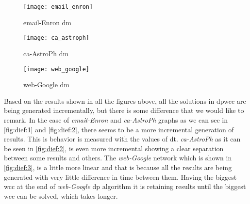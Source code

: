\begin{figure}[!htb]
    \centering
    \begin{minipage}{0.33\textwidth}
     \texttt{[image: email\_enron]}
      \caption{email-Enron \acrshort{dm}}
      \label{fig:dief:1}
    \end{minipage}%
    \begin{minipage}{0.33\textwidth}
     \texttt{[image: ca\_astroph]}
      \caption{ca-AstroPh \acrshort{dm}}
      \label{fig:dief:2}
    \end{minipage}%
    \begin{minipage}{0.33\textwidth}
     \texttt{[image: web\_google]}
      \caption{web-Google \acrshort{dm}}
      \label{fig:dief:3}
    \end{minipage}
\end{figure}

Based on the results shown in all the figures above, all the solutions in \acrshort{dpwcc} are being generated incrementally, 
but there is some difference that we would like to remark. In the case of \emph{email-Enron} and \emph{ca-AstroPh} graphs 
as we can see in \autoref{fig:dief:1} and \autoref{fig:dief:2}, there seems to be a more incremental generation of results. 
This is behavior is measured with the values of \acrfull{dt}. \emph{ca-AstroPh} as it can be seen in \autoref{fig:dief:2}, 
is even more incremental showing a clear separation between some results and others. The \emph{web-Google} network which is 
shown in \autoref{fig:dief:3}, is a little more linear and that is because all the results are being generated with very little 
difference in time between them. Having the biggest \acrshort{wcc} at the end of \emph{web-Google} \acrshort{dp} algorithm 
it is retaining results until the biggest \acrshort{wcc} can be solved, which takes longer. 


